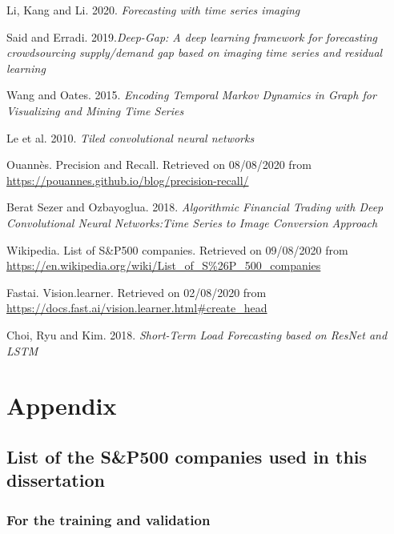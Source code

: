\documentclass[11pt]{article}
\begin{document}
\begin{onehalfspace}
\begin{thebibliography}{9}
    Li, Kang and Li. 2020. \textit{Forecasting with time series imaging}

    Said and Erradi. 2019.\textit{Deep-Gap: A deep learning framework for forecasting crowdsourcing supply/demand  gap  based  on  imaging  time  series  and  residual  learning}

    Wang and Oates. 2015. \textit{Encoding Temporal Markov Dynamics in Graph for Visualizing and Mining Time Series}

    Le et al. 2010. \textit{Tiled convolutional neural networks}

    Ouannès. Precision and Recall. Retrieved on 08/08/2020 from \url{https://pouannes.github.io/blog/precision-recall/}

    Berat Sezer and Ozbayoglua. 2018. \textit{Algorithmic Financial Trading with Deep Convolutional Neural Networks:Time Series to Image Conversion Approach}

    Wikipedia. List of S\&P500 companies. Retrieved on 09/08/2020 from \url{https://en.wikipedia.org/wiki/List_of_S%26P_500_companies}

    Fastai. Vision.learner. Retrieved on 02/08/2020 from \url{https://docs.fast.ai/vision.learner.html#create_head}

    Choi, Ryu and Kim. 2018. \textit{Short-Term Load Forecasting based on
    ResNet and LSTM}

\end{thebibliography}

\pagebreak

\section{Appendix}

\subsection{List of the S\&P500 companies used in this dissertation}
\label{505}
\subsubsection{For the training and validation}


\end{onehalfspace}
\end{document}
